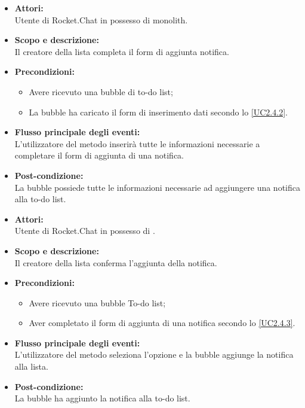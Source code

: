 
\begin{itemize}
	\item \textbf{Attori:}
	\\Utente di Rocket.Chat in possesso di monolith.
	\item \textbf{Scopo e descrizione:} 
	\\Il creatore della lista completa il form di aggiunta notifica.
	\item \textbf{Precondizioni:}
	\begin{itemize}
		\item Avere ricevuto una bubble di to-do list;
		\item La bubble ha caricato il form di inserimento dati secondo lo \ref{UC2.4.2}.
	\end{itemize}
	\item \textbf{Flusso principale degli eventi:}
	\\L'utilizzatore del metodo inserirà tutte le informazioni necessarie a completare il form di aggiunta di una notifica.
	\item \textbf{Post-condizione:}
	\\La bubble possiede tutte le informazioni necessarie ad aggiungere una notifica alla to-do list.
\end{itemize}


\begin{itemize}
	\item \textbf{Attori:}
	\\Utente di Rocket.Chat in possesso di \ProjectName{}.
	\item \textbf{Scopo e descrizione:} 
	\\Il creatore della lista conferma l'aggiunta della notifica.
	\item \textbf{Precondizioni:}
	\begin{itemize}
		\item Avere ricevuto una bubble To-do list;
		\item Aver completato il form di aggiunta di una notifica secondo lo \ref{UC2.4.3}.
	\end{itemize}
	\item \textbf{Flusso principale degli eventi:}
	\\L'utilizzatore del metodo seleziona l'opzione  e la bubble aggiunge la notifica alla lista.
	\item \textbf{Post-condizione:}
	\\La bubble ha aggiunto la notifica alla to-do list.
\end{itemize}

